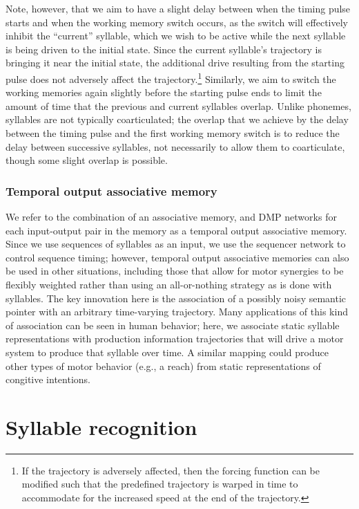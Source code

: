 Note, however, that we aim to
have a slight delay between
when the timing pulse starts
and when the working memory switch occurs,
as the switch will effectively
inhibit the ``current'' syllable,
which we wish to be active
while the next syllable is being
driven to the initial state.
Since the current syllable's trajectory
is bringing it near the initial state,
the additional drive resulting
from the starting pulse
does not adversely affect the
trajectory.\footnote{
  If the trajectory is adversely affected,
  then the forcing function can be modified
  such that the predefined trajectory is
  warped in time to accommodate for the
  increased speed at the end of the trajectory.}
Similarly, we aim to switch
the working memories again
slightly before the starting pulse ends
to limit the amount of time
that the previous and current syllables overlap.
Unlike phonemes, syllables are not
typically coarticulated;
the overlap that we achieve by the
delay between the timing pulse
and the first working memory switch
is to reduce the delay between
successive syllables,
not necessarily to allow them
to coarticulate,
though some slight overlap is possible.

\subsubsection{Temporal output associative memory}

We refer to
the combination of an associative memory,
and DMP networks
for each input-output pair in the memory
as a temporal output associative memory.
Since we use sequences of syllables
as an input, we use the sequencer network
to control sequence timing;
however, temporal output associative memories
can also be used in other situations,
including those that allow for
motor synergies to be
flexibly weighted rather than using
an all-or-nothing strategy
as is done with syllables.
The key innovation here is
the association of
a possibly noisy semantic pointer
with an arbitrary time-varying trajectory.
Many applications of this kind of association
can be seen in human behavior;
here, we associate static syllable representations
with production information trajectories
that will drive a motor system
to produce that syllable over time.
A similar mapping could produce
other types of motor behavior
(e.g., a reach)
from static representations
of congitive intentions.

\section{Syllable recognition}
\label{sec:impl-recog}

